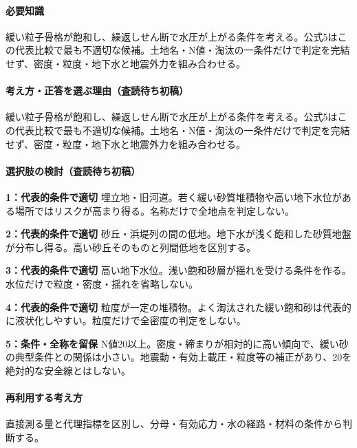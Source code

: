 \paragraph{必要知識} 緩い粒子骨格が飽和し、繰返しせん断で水圧が上がる条件を考える。公式5はこの代表比較で最も不適切な候補。土地名・N値・淘汰の一条件だけで判定を完結せず、密度・粒度・地下水と地震外力を組み合わせる。

\paragraph{考え方・正答を選ぶ理由（査読待ち初稿）} 緩い粒子骨格が飽和し、繰返しせん断で水圧が上がる条件を考える。公式5はこの代表比較で最も不適切な候補。土地名・N値・淘汰の一条件だけで判定を完結せず、密度・粒度・地下水と地震外力を組み合わせる。

\paragraph{選択肢の検討（査読待ち初稿）}\mbox{}\par

\noindent\textbf{1：代表的条件で適切} 埋立地・旧河道。若く緩い砂質堆積物や高い地下水位がある場所ではリスクが高まり得る。名称だけで全地点を判定しない。\par

\noindent\textbf{2：代表的条件で適切} 砂丘・浜堤列の間の低地。地下水が浅く飽和した砂質地盤が分布し得る。高い砂丘そのものと列間低地を区別する。\par

\noindent\textbf{3：代表的条件で適切} 高い地下水位。浅い飽和砂層が揺れを受ける条件を作る。水位だけで粒度・密度・揺れを省略しない。\par

\noindent\textbf{4：代表的条件で適切} 粒度が一定の堆積物。よく淘汰された緩い飽和砂は代表的に液状化しやすい。粒度だけで全密度の判定をしない。\par

\noindent\textbf{5：条件・全称を留保} N値20以上。密度・締まりが相対的に高い傾向で、緩い砂の典型条件との関係は小さい。地震動・有効上載圧・粒度等の補正があり、20を絶対的な安全線とはしない。\par

\paragraph{再利用する考え方} 直接測る量と代理指標を区別し、分母・有効応力・水の経路・材料の条件から判断する。

